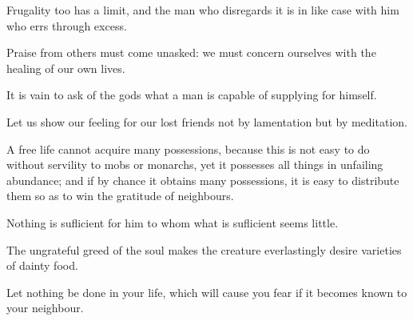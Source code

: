 \documentclass{stex}
\begin{document}
\vspace{0.5em}
\begin{sparagraph}[title=63]
  Frugality too has a limit, and the man who disregards it is in like case with him who errs through excess.
\end{sparagraph}

\vspace{0.5em}
\begin{sparagraph}[title=64]
  Praise from others must come unasked: we must concern ourselves with the healing of our own lives.
\end{sparagraph}

\vspace{0.5em}
\begin{sparagraph}[title=65]
  It is vain to ask of the gods what a man is capable of supplying for himself.
\end{sparagraph}

\vspace{0.5em}
\begin{sparagraph}[title=66]
  Let us show our feeling for our lost friends not by lamentation but by meditation.
\end{sparagraph}

\vspace{0.5em}
\begin{sparagraph}[title=67]
  A free life cannot acquire many possessions, because this is not easy to do without servility to mobs or monarchs, yet it possesses all things in unfailing abundance; and if by chance it obtains many possessions, it is easy to distribute them so as to win the gratitude of neighbours.
\end{sparagraph}

\vspace{0.5em}
\begin{sparagraph}[title=68]
  Nothing is suflicient for him to whom what is suflicient seems little.
\end{sparagraph}

\vspace{0.5em}
\begin{sparagraph}[title=69]
  The ungrateful greed of the soul makes the creature everlastingly desire varieties of dainty food.
\end{sparagraph}

\vspace{0.5em}
\begin{sparagraph}[title=70]
  Let nothing be done in your life, which will cause you fear if it becomes known to your neighbour.
\end{sparagraph}
\end{document}
